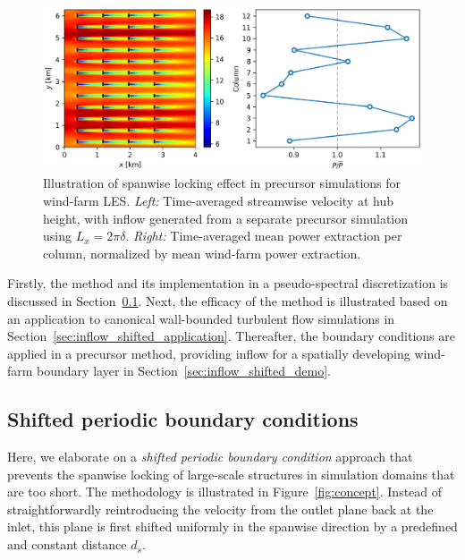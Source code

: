 \begin{figure}
	\centering 
	\includegraphics[width=\textwidth]{chapters/turbulent_inflow/illustrate_lock}
	\caption[Illustration of spanwise locking effect in precursor simulations for wind-farm LES.]{Illustration of spanwise locking effect in precursor simulations for wind-farm LES. \emph{Left: } Time-averaged streamwise velocity at hub height, with inflow generated from a separate precursor simulation using $L_x=2\pi\delta$. \emph{Right: } Time-averaged mean power extraction per column, normalized by mean wind-farm power extraction. \label{fig:inflow_illustrate_lock}}
\end{figure}

Firstly, the method and its implementation in a pseudo-spectral discretization is discussed in Section~\ref{sec:inflow_shifted_shifted}. Next, the efficacy of the method is illustrated based on an application to canonical wall-bounded turbulent flow simulations in Section~\ref{sec:inflow_shifted_application}. Thereafter, the boundary conditions are applied in a precursor method, providing inflow for a spatially developing wind-farm boundary layer in Section~\ref{sec:inflow_shifted_demo}.

	\subsection{Shifted periodic boundary conditions}\label{sec:inflow_shifted_shifted}
	Here, we elaborate on a \emph{shifted periodic boundary condition} approach that prevents the spanwise locking of large-scale structures in simulation domains that are too short. The methodology is illustrated in Figure~\ref{fig:concept}. Instead of straightforwardly reintroducing the velocity from the outlet plane back at the inlet, this plane is first shifted uniformly in the spanwise direction by a predefined and constant distance $d_s$. 
	
